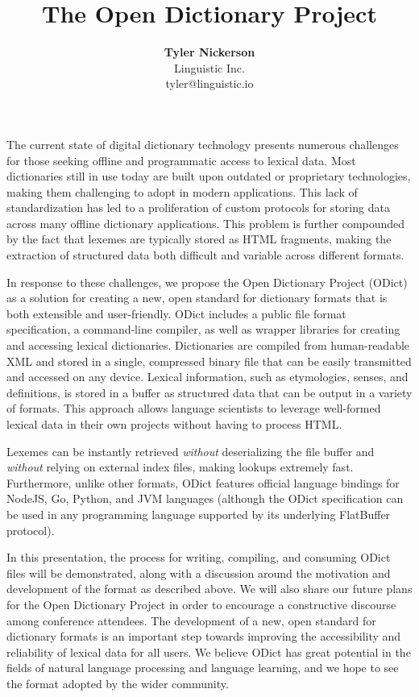 \documentclass{article}
\begin{document}
\title{\textbf{The Open Dictionary Project}}
\author{\textbf{Tyler Nickerson} \\ \small{Linguistic Inc.} \\ \small{tyler@linguistic.io}}
\date{}
\maketitle
The current state of digital dictionary technology presents numerous challenges for those seeking offline and programmatic access to lexical data. Most dictionaries still in use today are built upon outdated or proprietary technologies, making them challenging to adopt in modern applications. This lack of standardization has led to a proliferation of custom protocols for storing data across many offline dictionary applications. This problem is further compounded by the fact that lexemes are typically stored as HTML fragments, making the extraction of structured data both difficult and variable across different formats.

In response to these challenges, we propose the Open Dictionary Project (ODict) as a solution for creating a new, open standard for dictionary formats that is both extensible and user-friendly. ODict includes a public file format specification, a command-line compiler, as well as wrapper libraries for creating and accessing lexical dictionaries. Dictionaries are compiled from human-readable XML and stored in a single, compressed binary file that can be easily transmitted and accessed on any device. Lexical information, such as etymologies, senses, and definitions, is stored in a buffer as structured data that can be output in a variety of formats. This approach allows language scientists to leverage well-formed lexical data in their own projects without having to process HTML.

Lexemes can be instantly retrieved \emph{without} deserializing the file buffer and \emph{without} relying on external index files, making lookups extremely fast. Furthermore, unlike other formats, ODict features official language bindings for NodeJS, Go, Python, and JVM languages (although the ODict specification can be used in any programming language supported by its underlying FlatBuffer protocol).

In this presentation, the process for writing, compiling, and consuming ODict files will be demonstrated, along with a discussion around the motivation and development of the format as described above. We will also share our future plans for the Open Dictionary Project in order to encourage a constructive discourse among conference attendees. The development of a new, open standard for dictionary formats is an important step towards improving the accessibility and reliability of lexical data for all users. We believe ODict has great potential in the fields of natural language processing and language learning, and we hope to see the format adopted by the wider community.
\end{document}
